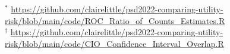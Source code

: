\documentclass[t,8pt,utfx8]{beamer}
\newcommand{\btVFill}{\vskip0pt plus 1filll}
\begin{document}
\begin{spacing}{1.25}
{$^*$ \url{https://github.com/clairelittle/psd2022-comparing-utility-risk/blob/main/code/ROC_Ratio_of_Counts_Estimates.R} \\
$^\dagger$ \url{https://github.com/clairelittle/psd2022-comparing-utility-risk/blob/main/code/CIO_Confidence_Interval_Overlap.R}

}








%     








\end{spacing}
\end{document}
